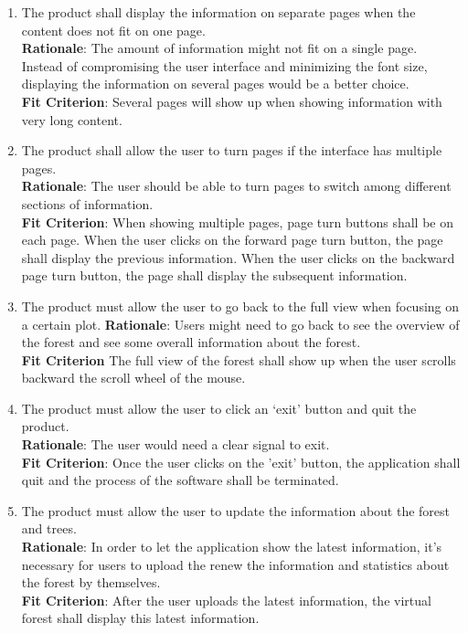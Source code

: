 \documentclass{article}
\begin{document}
\begin{enumerate}[FR1]
	\item The product shall display the information on separate pages when the content does not fit on one page.\\
	\textbf{Rationale}: The amount of information might not fit on a single page. Instead of compromising the user interface and minimizing the font size, displaying the information on several pages would be a better choice.\\
	\textbf{Fit Criterion}: Several pages will show up when showing information with very long content.
	
	\item The product shall allow the user to turn pages if the interface has multiple pages. \\
	\textbf{Rationale}: The user should be able to turn pages to switch among different sections of information.\\
	\textbf{Fit Criterion}: When showing multiple pages, page turn buttons shall be on each page. When the user clicks on the forward page turn button, the page shall display the previous information. When the user clicks on the backward page turn button, the page shall display the subsequent information.
	
	\item The product must allow the user to go back to the full view when focusing on a certain plot.
	\textbf{Rationale}: Users might need to go back to see the overview of the forest and see some overall information about the forest.  \\
	\textbf{Fit Criterion} The full view of the forest shall show up when the user scrolls backward the scroll wheel of the mouse.
	
	\item The product must allow the user to click an ‘exit’ button and quit the product.\\
	\textbf{Rationale}: The user would need a clear signal to exit.\\
	\textbf{Fit Criterion}: Once the user clicks on the 'exit' button, the application shall quit and the process of the software shall be terminated.
    
    \item The product must allow the user to update the information about the forest and trees.\\
	\textbf{Rationale}: In order to let the application show the latest information, it's necessary for users to upload the renew the information and statistics about the forest by themselves.\\
	\textbf{Fit Criterion}: After the user uploads the latest information, the virtual forest shall display this latest information. 
	

\end{enumerate}
\end{document}
